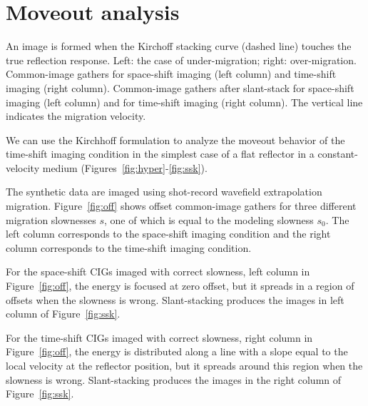 \section{Moveout analysis}
{An image is formed when the Kirchoff stacking
curve (dashed line) touches the true reflection response. 
Left: the case of under-migration; right: over-migration.}
{Common-image gathers for
space-shift imaging (left column) and
time-shift imaging (right column).}
{Common-image gathers after slant-stack
for space-shift imaging (left column) and
for time-shift imaging (right column).
The vertical line indicates the migration velocity.}

We can use the Kirchhoff formulation to analyze the moveout 
behavior of the time-shift imaging condition in the simplest 
case of a flat reflector in a constant-velocity medium 
(Figures~\ref{fig:hyper}-\ref{fig:ssk}). 

The synthetic data are imaged using shot-record 
wavefield extrapolation migration.
Figure~\ref{fig:off} shows offset
common-image gathers for three different migration
slownesses $s$, one of which is equal to the 
modeling slowness $s_0$.
The left column corresponds to the space-shift imaging condition
and the right column corresponds to the time-shift imaging condition.

For the space-shift CIGs imaged with correct slowness,
left column in Figure~\ref{fig:off},
the energy is focused at zero offset,
but it spreads in a region of offsets when the slowness is wrong.
Slant-stacking produces the images in left column of Figure~\ref{fig:ssk}.

For the time-shift CIGs imaged with correct slowness,
right column in Figure~\ref{fig:off},
the energy is distributed along a line with a slope equal 
to the local velocity at the reflector position,
but it spreads around this region when the slowness is wrong.
Slant-stacking produces the images in the right column of Figure~\ref{fig:ssk}.

